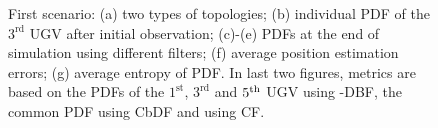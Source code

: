 \begin{figure}
		\caption{First scenario: (a) two types of topologies; (b) individual PDF of the $3^\text{rd}$ UGV after initial observation; (c)-(e) PDFs at the end of simulation using different filters; (f) average position estimation errors; (g) average entropy of PDF. In last two figures, metrics are based on the PDFs of the $1^\text{st}$, $3^\text{rd}$ and $5^\text{th}$ UGV using \proto-DBF, the common PDF using CbDF and using CF.}
		\label{fig:mov_sen_mov_tar1}
	\end{figure}
	
